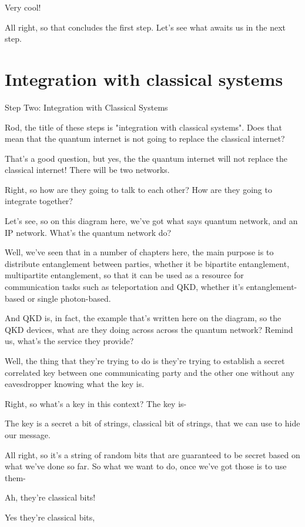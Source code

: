 Very cool!

All right, so that concludes the first step. Let's see what awaits us in the next step.

\section{Integration with classical systems}
\label{sec:classical-integration}

Step Two: Integration with Classical Systems

Rod, the title of these steps is "integration with classical systems". Does that mean that the quantum internet is not going to replace the classical internet?

That's a good question, but yes, the the quantum internet will not replace the classical internet! There will be two networks.

Right, so how are they going to talk to each other? How are they going to integrate together?

Let's see, so on this diagram here, we've got what says quantum network, and an IP network. What's the quantum network do?

Well, we've seen that in a number of chapters here, the main purpose is to distribute entanglement between parties, whether it be bipartite entanglement, multipartite entanglement, so that it can be used as a resource for communication tasks such as teleportation and QKD, whether it's entanglement-based or single photon-based.

And QKD is, in fact, the example that's written here on the diagram, so the QKD devices, what are they doing across across the quantum network? Remind us, what's the service they provide?

Well, the thing that they're trying to do is they're trying to establish a secret correlated key between one communicating party and the other one without any eavesdropper knowing what the key is.

Right, so what's a key in this context? The key is-

The key is a secret a bit of strings, classical bit of strings, that we can use to hide our message.

All right, so it's a string of random bits that are guaranteed to be secret based on what we've done so far. So what we want to do, once we've got those is to use them-

Ah, they're classical bits!

Yes they're classical bits,

